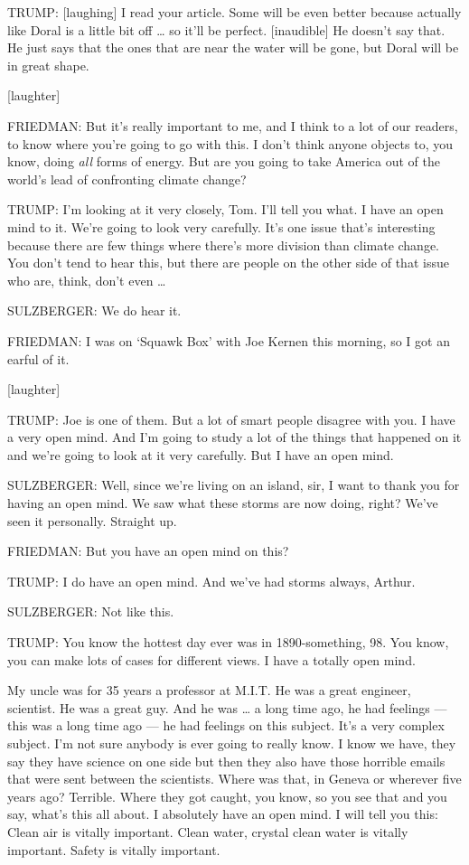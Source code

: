TRUMP: {[}laughing{]} I read your article. Some will be even better
because actually like Doral is a little bit off \ldots{} so it'll be
perfect. {[}inaudible{]} He doesn't say that. He just says that the ones
that are near the water will be gone, but Doral will be in great shape.

{[}laughter{]}

FRIEDMAN: But it's really important to me, and I think to a lot of our
readers, to know where you're going to go with this. I don't think
anyone objects to, you know, doing \emph{all} forms of energy. But are
you going to take America out of the world's lead of confronting climate
change?

TRUMP: I'm looking at it very closely, Tom. I'll tell you what. I have
an open mind to it. We're going to look very carefully. It's one issue
that's interesting because there are few things where there's more
division than climate change. You don't tend to hear this, but there are
people on the other side of that issue who are, think, don't even
\ldots{}

SULZBERGER: We do hear it.

FRIEDMAN: I was on `Squawk Box' with Joe Kernen this morning, so I got
an earful of it.

{[}laughter{]}

TRUMP: Joe is one of them. But a lot of smart people disagree with you.
I have a very open mind. And I'm going to study a lot of the things that
happened on it and we're going to look at it very carefully. But I have
an open mind.

SULZBERGER: Well, since we're living on an island, sir, I want to thank
you for having an open mind. We saw what these storms are now doing,
right? We've seen it personally. Straight up.

FRIEDMAN: But you have an open mind on this?

TRUMP: I do have an open mind. And we've had storms always, Arthur.

SULZBERGER: Not like this.

TRUMP: You know the hottest day ever was in 1890-something, 98. You
know, you can make lots of cases for different views. I have a totally
open mind.

My uncle was for 35 years a professor at M.I.T. He was a great engineer,
scientist. He was a great guy. And he was \ldots{} a long time ago, he
had feelings --- this was a long time ago --- he had feelings on this
subject. It's a very complex subject. I'm not sure anybody is ever going
to really know. I know we have, they say they have science on one side
but then they also have those horrible emails that were sent between the
scientists. Where was that, in Geneva or wherever five years ago?
Terrible. Where they got caught, you know, so you see that and you say,
what's this all about. I absolutely have an open mind. I will tell you
this: Clean air is vitally important. Clean water, crystal clean water
is vitally important. Safety is vitally important.

